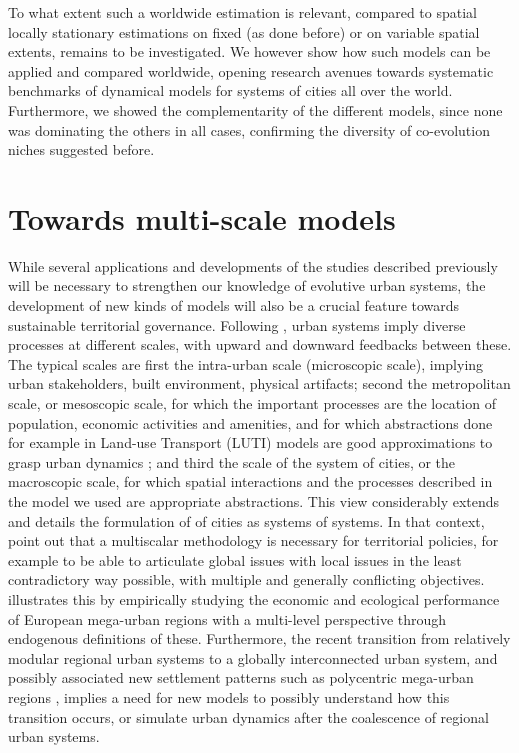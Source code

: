 \documentclass[11pt]{article}
\begin{document}
To what extent such a worldwide estimation is relevant, compared to spatial locally stationary estimations on fixed (as done before) or on variable spatial extents, remains to be investigated. We however show how such models can be applied and compared worldwide, opening research avenues towards systematic benchmarks of dynamical models for systems of cities all over the world. Furthermore, we showed the complementarity of the different models, since none was dominating the others in all cases, confirming the diversity of co-evolution niches suggested before.


\section{Towards multi-scale models}

While several applications and developments of the studies described previously will be necessary to strengthen our knowledge of evolutive urban systems, the development of new kinds of models will also be a crucial feature towards sustainable territorial governance. Following \cite{pumain2008socio}, urban systems imply diverse processes at different scales, with upward and downward feedbacks between these. The typical scales are first the intra-urban scale (microscopic scale), implying urban stakeholders, built environment, physical artifacts; second the metropolitan scale, or mesoscopic scale, for which the important processes are the location of population, economic activities and amenities, and for which abstractions done for example in Land-use Transport (LUTI) models are good approximations to grasp urban dynamics \cite{wegener2004land}; and third the scale of the system of cities, or the macroscopic scale, for which spatial interactions and the processes described in the model we used are appropriate abstractions. This view considerably extends and details the formulation of \cite{berry1964cities} of cities as systems of systems. In that context, \cite{rozenblat2018conclusion} point out that a multiscalar methodology is necessary for territorial policies, for example to be able to articulate global issues with local issues in the least contradictory way possible, with multiple and generally conflicting objectives. \cite{raimbault2019multi} illustrates this by empirically studying the economic and ecological performance of European mega-urban regions with a multi-level perspective through endogenous definitions of these. Furthermore, the recent transition from relatively modular regional urban systems to a globally interconnected urban system, and possibly associated new settlement patterns such as polycentric mega-urban regions \cite{le2017etalement}, implies a need for new models to possibly understand how this transition occurs, or simulate urban dynamics after the coalescence of regional urban systems.
\end{document}
